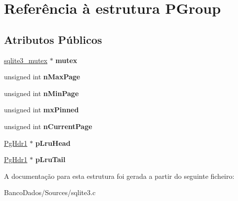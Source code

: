 \hypertarget{struct_p_group}{\section{Referência à estrutura P\-Group}
\label{struct_p_group}
}
\subsection*{Atributos Públicos}
\begin{DoxyCompactItemize}
\item 
\hypertarget{struct_p_group_a7173aa723aa61d6b1f79cde2f7d0f74d}{\hyperlink{structsqlite3__mutex}{sqlite3\-\_\-mutex} $\ast$ {\bfseries mutex}}\label{struct_p_group_a7173aa723aa61d6b1f79cde2f7d0f74d}

\item 
\hypertarget{struct_p_group_a219ff89d38529cbb6b47e60f41896f41}{unsigned int {\bfseries n\-Max\-Page}}\label{struct_p_group_a219ff89d38529cbb6b47e60f41896f41}

\item 
\hypertarget{struct_p_group_aedf84324cb7138c9f9ee31814e8274c0}{unsigned int {\bfseries n\-Min\-Page}}\label{struct_p_group_aedf84324cb7138c9f9ee31814e8274c0}

\item 
\hypertarget{struct_p_group_ac7cdffac1c20d260e8230dba4ab05cea}{unsigned int {\bfseries mx\-Pinned}}\label{struct_p_group_ac7cdffac1c20d260e8230dba4ab05cea}

\item 
\hypertarget{struct_p_group_a532a09e3e6bf7a20a934764b4bd698a5}{unsigned int {\bfseries n\-Current\-Page}}\label{struct_p_group_a532a09e3e6bf7a20a934764b4bd698a5}

\item 
\hypertarget{struct_p_group_a3d8ff5ee67a873462209676d0fc4c5a2}{\hyperlink{struct_pg_hdr1}{Pg\-Hdr1} $\ast$ {\bfseries p\-Lru\-Head}}\label{struct_p_group_a3d8ff5ee67a873462209676d0fc4c5a2}

\item 
\hypertarget{struct_p_group_a2c58c2f107352bccedc6e49b5f07a486}{\hyperlink{struct_pg_hdr1}{Pg\-Hdr1} $\ast$ {\bfseries p\-Lru\-Tail}}\label{struct_p_group_a2c58c2f107352bccedc6e49b5f07a486}

\end{DoxyCompactItemize}


A documentação para esta estrutura foi gerada a partir do seguinte ficheiro\-:\begin{DoxyCompactItemize}
\item 
Banco\-Dados/\-Sources/sqlite3.\-c\end{DoxyCompactItemize}

